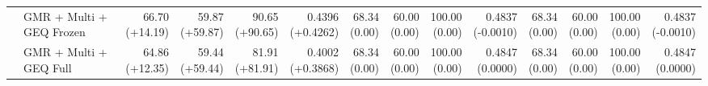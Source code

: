 \documentclass{article}
\begin{document}
{\begin{tabular}{llrrrrrrrrrrrr}
 & GMR + Multi + GEQ Frozen & \shortstack{66.70 \\ {\scriptsize\textcolor{Gain}{(+14.19)}}} & \shortstack{59.87 \\ {\scriptsize\textcolor{Gain}{(+59.87)}}} & \shortstack{90.65 \\ {\scriptsize\textcolor{Gain}{(+90.65)}}} & \shortstack{0.4396 \\ {\scriptsize\textcolor{Gain}{(+0.4262)}}} & \shortstack{68.34 \\ {\scriptsize\textcolor{Zero}{(0.00)}}} & \shortstack{60.00 \\ {\scriptsize\textcolor{Zero}{(0.00)}}} & \shortstack{100.00 \\ {\scriptsize\textcolor{Zero}{(0.00)}}} & \shortstack{0.4837 \\ {\scriptsize\textcolor{Loss}{(-0.0010)}}} & \shortstack{68.34 \\ {\scriptsize\textcolor{Zero}{(0.00)}}} & \shortstack{60.00 \\ {\scriptsize\textcolor{Zero}{(0.00)}}} & \shortstack{100.00 \\ {\scriptsize\textcolor{Zero}{(0.00)}}} & \shortstack{0.4837 \\ {\scriptsize\textcolor{Loss}{(-0.0010)}}} \\
 & GMR + Multi + GEQ Full & \shortstack{64.86 \\ {\scriptsize\textcolor{Gain}{(+12.35)}}} & \shortstack{59.44 \\ {\scriptsize\textcolor{Gain}{(+59.44)}}} & \shortstack{81.91 \\ {\scriptsize\textcolor{Gain}{(+81.91)}}} & \shortstack{0.4002 \\ {\scriptsize\textcolor{Gain}{(+0.3868)}}} & \shortstack{68.34 \\ {\scriptsize\textcolor{Zero}{(0.00)}}} & \shortstack{60.00 \\ {\scriptsize\textcolor{Zero}{(0.00)}}} & \shortstack{100.00 \\ {\scriptsize\textcolor{Zero}{(0.00)}}} & \shortstack{0.4847 \\ {\scriptsize\textcolor{Zero}{(0.0000)}}} & \shortstack{68.34 \\ {\scriptsize\textcolor{Zero}{(0.00)}}} & \shortstack{60.00 \\ {\scriptsize\textcolor{Zero}{(0.00)}}} & \shortstack{100.00 \\ {\scriptsize\textcolor{Zero}{(0.00)}}} & \shortstack{0.4847 \\ {\scriptsize\textcolor{Zero}{(0.0000)}}} \\

\end{tabular}}
\end{document}
